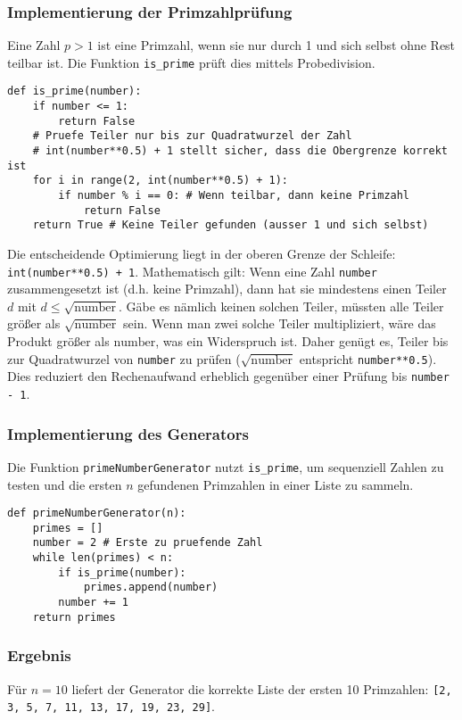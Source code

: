 \documentclass[titlepage]{article}
\begin{document}
\subsubsection{Implementierung der Primzahlprüfung}
Eine Zahl $p > 1$ ist eine Primzahl, wenn sie nur durch 1 und sich selbst ohne Rest teilbar ist. Die Funktion \texttt{is\_prime} prüft dies mittels Probedivision.
\begin{lstlisting}[caption={Python-Funktion zur Prüfung auf Primalität}, label=lst:is_prime]
def is_prime(number):
    if number <= 1:
        return False
    # Pruefe Teiler nur bis zur Quadratwurzel der Zahl
    # int(number**0.5) + 1 stellt sicher, dass die Obergrenze korrekt ist
    for i in range(2, int(number**0.5) + 1):
        if number % i == 0: # Wenn teilbar, dann keine Primzahl
            return False
    return True # Keine Teiler gefunden (ausser 1 und sich selbst)
\end{lstlisting}
Die entscheidende Optimierung liegt in der oberen Grenze der Schleife: \texttt{int(number**0.5) + 1}. Mathematisch gilt: Wenn eine Zahl \texttt{number} zusammengesetzt ist (d.h. keine Primzahl), dann hat sie mindestens einen Teiler $d$ mit $d \leq \sqrt{\text{number}}$. Gäbe es nämlich keinen solchen Teiler, müssten alle Teiler größer als $\sqrt{\text{number}}$ sein. Wenn man zwei solche Teiler multipliziert, wäre das Produkt größer als $\text{number}$, was ein Widerspruch ist. Daher genügt es, Teiler bis zur Quadratwurzel von \texttt{number} zu prüfen ($\sqrt{\text{number}}$ entspricht \texttt{number**0.5}). Dies reduziert den Rechenaufwand erheblich gegenüber einer Prüfung bis \texttt{number - 1}.

\subsubsection{Implementierung des Generators}
Die Funktion \texttt{primeNumberGenerator} nutzt \texttt{is\_prime}, um sequenziell Zahlen zu testen und die ersten $n$ gefundenen Primzahlen in einer Liste zu sammeln.
\begin{lstlisting}[caption={Python-Funktion zur Generierung der ersten n Primzahlen}, label=lst:prime_gen]
def primeNumberGenerator(n):
    primes = []
    number = 2 # Erste zu pruefende Zahl
    while len(primes) < n:
        if is_prime(number):
            primes.append(number)
        number += 1
    return primes
\end{lstlisting}

\subsubsection{Ergebnis}
Für $n=10$ liefert der Generator die korrekte Liste der ersten 10 Primzahlen: \texttt{[2, 3, 5, 7, 11, 13, 17, 19, 23, 29]}.
\end{document}
